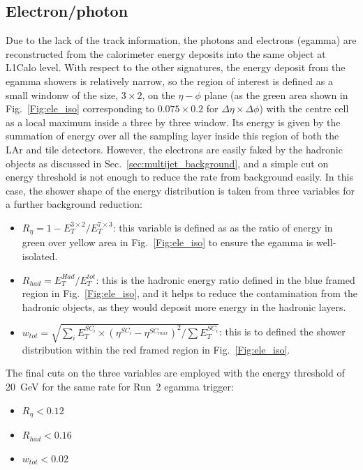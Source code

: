 \subsection{Electron/photon}
Due to the lack of the track information, the photons and electrons (egamma) are reconstructed from the calorimeter energy deposits into the same object at L1Calo level. With respect to the other signatures, the energy deposit from the egamma  showers is relatively narrow, so the region of interest is defined as a small windonw of the size, $3\times2$, on the $\eta-\phi$ plane (as the green area shown in Fig.~\ref{Fig:ele_iso} corresponding to $0.075\times0.2$ for $\Delta\eta\times\Delta\phi$) with the centre cell as a local maximum inside a three by three window. Its energy is given by the summation of energy over all the sampling layer inside this region of both the LAr and tile detectors. However, the electrons are easily faked by the hadronic objects as discussed in Sec.~\ref{sec:multijet_background}, and a simple cut on energy threshold is not enough to reduce the rate from background easily. In this case, the shower shape of the energy distribution is taken from three variables for a further background reduction:
\begin{itemize}
	\item $R_\eta=1-E_{T}^{3\times2}/E_{T}^{7\times3}$: this variable is defined as as the ratio of energy in green over yellow area in Fig.~\ref{Fig:ele_iso} to ensure the egamma is well-isolated. 
	\item $R_{had} = E^{Had}_{T}/E^{tot}_{T}$: this is the hadronic energy ratio defined in the blue framed region in Fig.~\ref{Fig:ele_iso}, and it helps to reduce the contamination from the hadronic objects, as they would deposit more energy in the hadronic layers.
	\item $w_{tot}=\sqrt{\sum_i E^{SC_i}_{T}\times(\eta^{SC_i}-\eta^{SC_{max}})^2/\sum E^{SC_i}_{T}}$: this is to defined the shower distribution within the red framed region in Fig.~\ref{Fig:ele_iso}. 
\end{itemize}
The final cuts on the three variables are employed with the energy threshold of 20~GeV for the same rate for Run~2 egamma trigger:
\begin{itemize}
	\item $R_\eta<0.12$
	\item $R_{had}<0.16$
	\item $w_{tot}<0.02$
\end{itemize}

